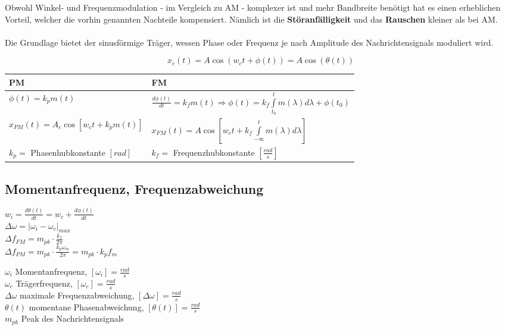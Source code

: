 Obwohl Winkel- und Frequenzmodulation - im Vergleich zu AM - komplexer ist und mehr Bandbreite
benötigt hat es einen erheblichen Vorteil, welcher die vorhin genannten Nachteile kompensiert.
Nämlich ist die \textbf{Störanfälligkeit} und das \textbf{Rauschen} kleiner als bei AM. \\
\\
Die Grundlage bietet der sinusförmige Träger, wessen Phase oder Frequenz je nach Amplitude des 
Nachrichtensignals moduliert wird.

$$\boxed{ x_c(t) = A \cos(w_c t + \phi(t)) = A \cos(\theta(t)) }$$

\begin{center}
\renewcommand{\arraystretch}{2}
\begin{tabular}{|p{8cm}|p{8cm}|}
	\hline
	\textbf{PM} &	\textbf{FM}\\
	\hline
	$\phi(t) = k_p m(t)$ &
	$ \frac{d \phi(t)}{dt} = k_f m(t) \Rightarrow \phi(t) = k_f \int\limits_{t_0}^{t} m(\lambda)
	d\lambda + \phi(t_0)$\\
	$x_{PM}(t) = A_c \cos[w_c t + k_p m(t)]$ &
	$x_{FM}(t) = A \cos[w_c t + k_f \int\limits_{- \infty}^{t} m(\lambda)
	d\lambda]$\\
	\hline
	$k_p=$ Phasenhubkonstante $[rad]$ & $k_f=$ Frequenzhubkonstante
	$[\frac{rad}{s}]$\\
	\hline
\end{tabular} 
\renewcommand{\arraystretch}{1}
\end{center}


\subsection{Momentanfrequenz, Frequenzabweichung}
\begin{multicols}{2}
	\begin{center}
		$ w_i = \frac{d \theta(t)}{dt} = w_c + \frac{d \phi(t)}{dt} $\\
		$ \Delta \omega = \left| \omega_i - \omega_c \right|_{max} $\\
		$ \Delta f_{FM} =  m_{pk} \cdot \frac{k_f}{2\pi}$\\
		$ \Delta f_{PM} = m_{pk} \cdot \frac{k_p \omega_m}{2\pi} =  m_{pk} \cdot
		k_p f_m$
	\end{center}
\columnbreak

	$\omega_i$ Momentanfrequenz, $[\omega_i] = \frac{rad}{s}$ \\
	$\omega_c$ Trägerfrequenz, $[\omega_c] = \frac{rad}{s}$ \\
	$\Delta \omega$ maximale Frequenzabweichung, $[\Delta \omega] = \frac{rad}{s}$ \\
	$\theta(t)$ momentane Phasenabweichung, $[\theta(t)] = \frac{rad}{s}$ \\
	$m_{pk}$ Peak des Nachrichtensignals
\end{multicols}


